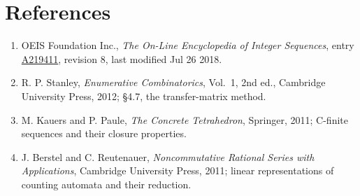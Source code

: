 \documentclass[11pt]{article}
\theoremstyle{definition}
\begin{document}
\section{References}

\begin{enumerate}

\item OEIS Foundation Inc., \emph{The On-Line Encyclopedia of Integer Sequences}, entry \href{https://oeis.org/A219411}{A219411}, revision 8, last modified Jul 26 2018.

\item R. P. Stanley, \emph{Enumerative Combinatorics}, Vol.~1, 2nd ed., Cambridge University Press, 2012; \S4.7, the transfer-matrix method.

\item M. Kauers and P. Paule, \emph{The Concrete Tetrahedron}, Springer, 2011; C-finite sequences and their closure properties.

\item J. Berstel and C. Reutenauer, \emph{Noncommutative Rational Series with Applications}, Cambridge University Press, 2011; linear representations of counting automata and their reduction.

\end{enumerate}
\end{document}
